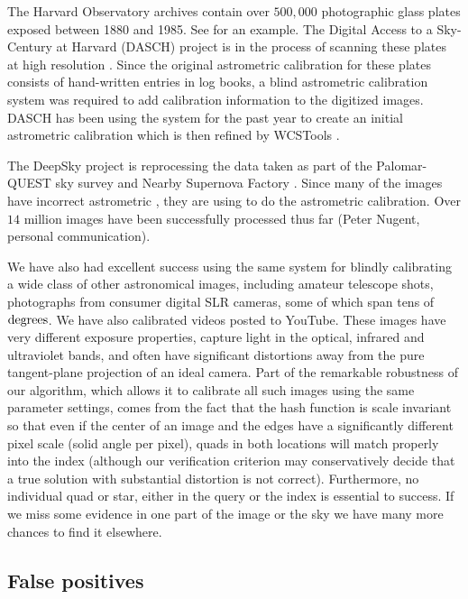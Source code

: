The Harvard Observatory archives contain over $500,000$ photographic
glass plates exposed between 1880 and 1985.  See 
for an example.  The Digital Access to a Sky-Century at Harvard (DASCH)
project is in the process of scanning these plates at high
resolution \cite{harvardplates,dasch}.  Since the original astrometric
calibration for these plates consists of hand-written entries in log
books, a blind astrometric calibration system was required to add
calibration information to the digitized images.  DASCH has been using
the \an system for the past year to create an initial astrometric
calibration which is then refined by WCSTools \cite{wcstools4}.


The DeepSky project \cite{deepsky} is reprocessing the data taken as
part of the Palomar-QUEST sky survey and Nearby Supernova
Factory \cite{palomarquest, nearbysnfactory}.  Since many of the images
have incorrect astrometric \metadata, they are using \an to do the
astrometric calibration.  Over $14$ million images have been
successfully processed thus far (Peter Nugent, personal
communication).


We have also had excellent success using the same system for blindly
calibrating a wide class of other astronomical images, including
amateur telescope shots, photographs from consumer digital SLR
cameras, some of which span tens of $\mathrm{degrees}$.  We have also
calibrated videos posted to YouTube.  These images have very different
exposure properties, capture light in the optical, infrared and
ultraviolet bands, and often have significant distortions away from
the pure tangent-plane projection of an ideal camera.  Part of the
remarkable robustness of our algorithm, which allows it to calibrate
all such images using the same parameter settings, comes from the fact
that the hash function is scale invariant so that even if the center
of an image and the edges have a significantly different pixel scale
(solid angle per pixel), quads in both locations will match properly
into the index (although our verification criterion may conservatively
decide that a true solution with substantial distortion is not
correct). Furthermore, no individual quad or star, either in the query
or the index is essential to success. If we miss some evidence in one
part of the image or the sky we have many more chances to find it
elsewhere.


\subsection{False positives}


